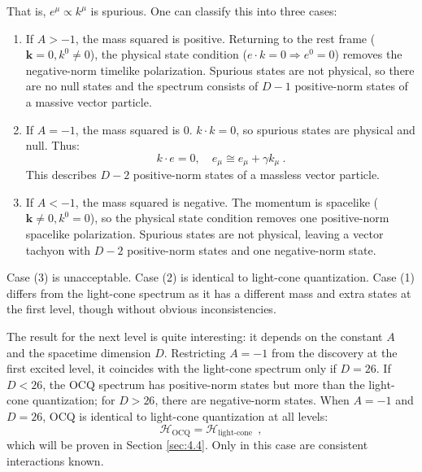 That is, $e^{\mu} \propto k^{\mu}$ is spurious. One can classify this into three cases: 
\begin{enumerate}
	\item If $A>-1$, the mass squared is positive. Returning to the rest frame ($\mathbf{k}=0, k^{0} \neq 0$), the physical state condition ($e \cdot k=0 \Rightarrow e^{0}=0$) removes the negative-norm timelike polarization. Spurious states are not physical, so there are no null states and the spectrum consists of $D-1$ positive-norm states of a massive vector particle.
	\item If $A=-1$, the mass squared is 0. $k \cdot k=0$, so spurious states are physical and null. Thus:
	\begin{equation}
		k \cdot e=0, \quad e_{\mu} \cong e_{\mu}+\gamma k_{\mu} \:. \label{4.1.19}
	\end{equation}
	This describes $D-2$ positive-norm states of a massless vector particle.
	\item If $A<-1$, the mass squared is negative. The momentum is spacelike ($\mathbf{k} \neq 0, k^{0} = 0$), so the physical state condition removes one positive-norm spacelike polarization. Spurious states are not physical, leaving a vector tachyon with $D-2$ positive-norm states and one negative-norm state.
\end{enumerate}
Case (3) is unacceptable. Case (2) is identical to light-cone quantization. Case (1) differs from the light-cone spectrum as it has a different mass and extra states at the first level, though without obvious inconsistencies.

The result for the next level is quite interesting: it depends on the constant $A$ and the spacetime dimension $D$. Restricting $A=-1$ from the discovery at the first excited level, it coincides with the light-cone spectrum only if $D=26$. If $D<26$, the OCQ spectrum has positive-norm states but more than the light-cone quantization; for $D>26$, there are negative-norm states. When $A=-1$ and $D=26$, OCQ is identical to light-cone quantization at all levels:
\begin{equation}
	\mathscr{H}_{\mathrm{OCQ}}=\mathscr{H}_{\text {light-cone }} \:, \label{4.1.20}
\end{equation}
which will be proven in Section \ref{sec:4.4}. Only in this case are consistent interactions known.


